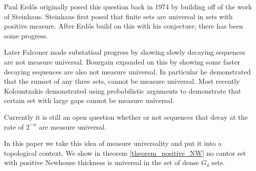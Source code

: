 Paul Erd\H{o}s originally posed this question back in 1974 by building off of the work of Steinhaus.  Steinhaus\cite{Steinhaus} first posed that finite sets are universal in sets with positive measure.  After Erd\H{o}s build on this with his conjecture, there has been some progress.

Later Falconer \cite{Falconer} made substatioal progress by showing slowly decaying sequences are not measure universal.  Bourgain \cite{Bourgain} expanded on this by showing some faster decaying sequences are also not measure universal.  In particular he demonstrated that the sumset of any three sets, cannot be measure universal.  Most recently Kolountzakis \cite{Kolo} demonstrated using probabilistic arguments to demonstrate that certain set with large gaps cannot be measure universal.  

Currently it is still an open question whether or not sequences that decay at the rate of $2^{-n}$ are measure universal. 


In this paper we take this idea of measure universality and put it into a topological context.  We show in theorem \ref{theorem_positive_NW} no cantor set with positive Newhouse thickness is universal in the set of dense $G_\delta$ sets.



